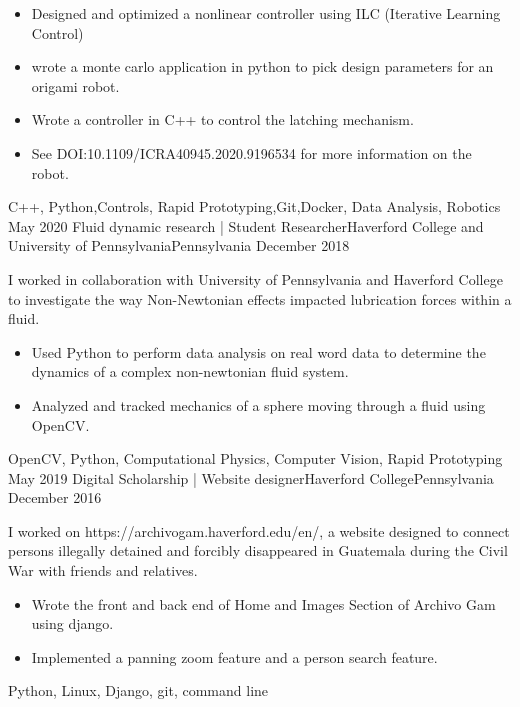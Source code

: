 \begin{experiences}
{                      \begin{itemize}
			\item Designed and optimized a nonlinear controller using ILC (Iterative Learning Control) 
			\item wrote a monte carlo application in python to pick design parameters for an origami robot.
			\item Wrote a controller in C++ to control the latching mechanism.
			\item  See DOI:10.1109/ICRA40945.2020.9196534 for more information on the robot.
                      \end{itemize}
                    }
                    {C++, Python,Controls, Rapid Prototyping,Git,Docker, Data Analysis, Robotics}
  \experience
    {May 2020}   {Fluid dynamic research | Student Researcher}{Haverford College and University of Pennsylvania}{Pennsylvania}
    {December 2018} {
  I worked in collaboration with University of Pennsylvania and Haverford College to investigate the way Non-Newtonian effects impacted lubrication forces within a fluid.
                      \begin{itemize}
                        \item  Used Python to perform data analysis on real word data to determine the dynamics of a complex non-newtonian fluid system.
                         \item Analyzed and tracked mechanics of a sphere moving through a fluid using OpenCV.
                      \end{itemize}
                    }
                    {OpenCV, Python, Computational Physics, Computer Vision, Rapid Prototyping}
  \experience
    {May 2019}   {Digital Scholarship | Website designer}{Haverford College}{Pennsylvania}
    {December 2016} {
    I worked on https://archivogam.haverford.edu/en/, a website designed to connect persons illegally detained and forcibly disappeared in Guatemala during the Civil War with friends and relatives.
                      \begin{itemize}
                       \item Wrote the front and back end of Home and Images Section of Archivo Gam using django.
		     \item Implemented a panning zoom feature and a person search feature.
                      \end{itemize}
                    }
                    {Python, Linux, Django, git, command line }
\end{experiences}
